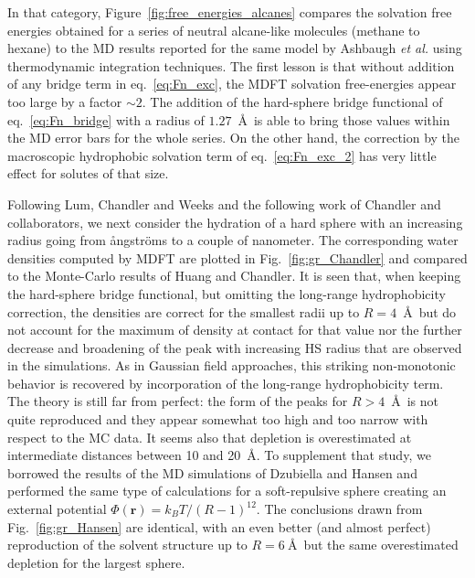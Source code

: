 \documentclass[aip,jcp,showpacs,amsmath,amssymb,superscriptaddress]{revtex4-1}
\newcommand{\rr}{\mathbf{r}}
\newcommand{\angstrom}{\r{a}ngstr\"{o}m}
\begin{document}
In that category, Figure~\ref{fig:free_energies_alcanes} compares the solvation free energies obtained for a series of  neutral alcane-like  molecules (methane to hexane) to the MD results reported for the same model by  Ashbaugh {\em et al.} using thermodynamic integration techniques\cite{ashbaugh_hydration_1998}. The first lesson is that without addition of any bridge term in eq.~\ref{eq:Fn_exc}, the MDFT solvation free-energies appear too large by a factor $\sim 2$. The addition of the hard-sphere bridge functional of eq.~\ref{eq:Fn_bridge} with a radius of $1.27$~\AA  ~is able to bring those values within the MD  error bars for the whole series. On the other hand, the correction by the macroscopic hydrophobic solvation term of eq.~\ref{eq:Fn_exc_2} has very little effect for solutes of that size.

Following Lum, Chandler and Weeks\cite{lum99} and the following work of Chandler and collaborators\cite{tenwolde01,huang02,varilly11},  we next consider the hydration of a hard sphere with an increasing radius going from  \angstrom s to   a couple of nanometer.  The corresponding water densities computed by MDFT are plotted in Fig.~\ref{fig:gr_Chandler} and compared to the Monte-Carlo results of Huang and Chandler\cite{huang02}. It is seen that, when keeping the hard-sphere bridge functional, but omitting the long-range hydrophobicity correction, the densities are correct for the smallest radii up to $R=4$~\AA~but do not account for the maximum of density at contact for that value nor the further  decrease and broadening of the peak with increasing HS  radius that are   observed  in the simulations. As in Gaussian field approaches, this striking  non-monotonic behavior is recovered by incorporation of the long-range hydrophobicity term. The theory is still far from perfect:  the form of the peaks for $R>4$~\AA ~is not quite reproduced and they appear somewhat too high and too narrow with respect to the MC data. It seems also that depletion is overestimated at intermediate distances between 10 and 20~\AA. To supplement that study, we borrowed the results of the MD simulations of Dzubiella and Hansen\cite{dzubiella04} and performed the same type of calculations  for a soft-repulsive sphere creating an external potential   $\Phi(\rr) = k_BT/(R -1)^{12}$. 
The conclusions drawn from Fig.~\ref{fig:gr_Hansen} are identical, with  an even better (and almost perfect) reproduction of the solvent structure up to $R=6~$\AA ~but the same overestimated depletion for the largest sphere. 
\end{document}
